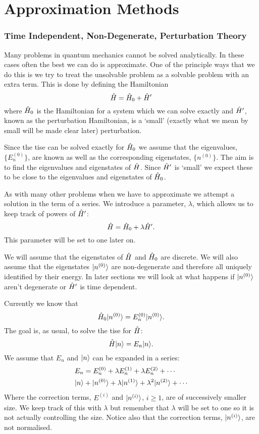 \part{Approximation Methods}
    \section{Time Independent, Non-Degenerate, Perturbation Theory}
    Many problems in quantum mechanics cannot be solved analytically.
    In these cases often the best we can do is approximate.
    One of the principle ways that we do this is we try to treat the unsolvable problem as a solvable problem with an extra term.
    This is done by defining the Hamiltonian
    \[\hat{H} = \hat{H}_0 + \hat{H}'\]
    where \(\hat{H}_0\) is the Hamiltonian for a system which we can solve exactly and \(\hat{H}'\), known as the perturbation Hamiltonian, is a `small' (exactly what we mean by small will be made clear later) perturbation.
    
    Since the \gls{tise} can be solved exactly for \(\hat{H}_0\) we assume that the eigenvalues, \(\{E_{n}^{(0)}\}\), are known as well as the corresponding eigenstates, \(\{n^{(0)}\}\).
    The aim is to find the eigenvalues and eigenstates of \(\hat{H}\).
    Since \(\hat{H}'\) is `small' we expect these to be close to the eigenvalues and eigenstates of \(\hat{H}_0\).
    
    As with many other problems when we have to approximate we attempt a solution in the term of a series.
    We introduce a parameter, \(\lambda\), which allows us to keep track of powers of \(\hat{H}'\):
    \[\hat{H} = \hat{H}_0 + \lambda\hat{H}'.\]
    This parameter will be set to one later on.
    
    We will assume that the eigenstates of \(\hat{H}\) and \(\hat{H}_0\) are discrete.
    We will also assume that the eigenstates \(\vert {n^{(0)}} \rangle\) are non-degenerate and therefore all uniquely identified by their energy.
    In later sections we will look at what happens if \(\vert {n^{(0)}} \rangle\) aren't degenerate or \(\hat{H}'\) is time dependent.
    
    Currently we know that
    \[\hat{H}_0\vert {n^{(0)}} \rangle = E_n^{(0)}\vert {n^{(0)}} \rangle.\]
    The goal is, as usual, to solve the \gls{tise} for \(\hat{H}\):
    \[\hat{H}\vert {n} \rangle = E_n\vert {n} \rangle.\]
    We assume that \(E_n\) and \(\vert {n} \rangle\) can be expanded in a series:
    \begin{align*}
        E_n &= E_n^{(0)} + \lambda E_n^{(1)} + \lambda E_n^{(2)} + \dotsb\\
        \vert {n} \rangle &+ \vert {n^{(0)}} \rangle + \lambda\vert {n^{(1)}} \rangle + \lambda^2\vert {n^{(2)}} \rangle + \dotsb
    \end{align*}
    Where the correction terms, \(E^{(i)}\) and \(\vert {n^{(i)}} \rangle\), \(i \ge 1\), are of successively smaller size.
    We keep track of this with \(\lambda\) but remember that \(\lambda\) will be set to one so it is not actually controlling the size.
    Notice also that the correction terms, \(\vert {n^{(i)}} \rangle\), are not normalised.
    
